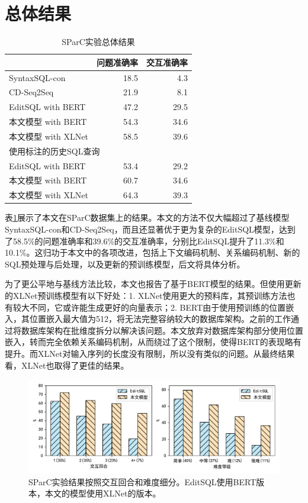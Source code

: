 \section{总体结果}

\begin{table}[]
    \centering
    \caption{SParC实验总体结果}
    \begin{tabular}{lrr}
    \hline
                        & 问题准确率 & 交互准确率 \\ \hline
    SyntaxSQL-con       & 18.5  & 4.3   \\
    CD-Seq2Seq          & 21.9  & 8.1   \\
    EditSQL with   BERT & 47.2  & 29.5  \\
    本文模型 with BERT      & 54.3  & 34.6  \\
    本文模型 with XLNet     & 58.5  & 39.6  \\ \hline
    \multicolumn{3}{l}{使用标注的历史SQL查询}    \\ \hline
    EditSQL with   BERT & 53.4  & 29.2  \\
    本文模型 with BERT      & 60.7  & 34.6  \\
    本文模型 with XLNet     & 64.3  & 39.3  \\ \hline
    \end{tabular}
    \label{overall-results}
\end{table}

表\ref{overall-results}展示了本文在SParC数据集上的结果。本文的方法不仅大幅超过了基线模型SyntaxSQL-con和CD-Seq2Seq，而且还显著优于更为复杂的EditSQL模型，达到了58.5\%的问题准确率和39.6\%的交互准确率，分别比EditSQL提升了11.3\%和10.1\%。这归功于本文中的各项改进，包括上下文编码机制、关系编码机制、新的SQL预处理与后处理，以及更新的预训练模型，后文将具体分析。

为了更公平地与基线方法比较，本文也报告了基于BERT模型的结果。但使用更新的XLNet预训练模型有以下好处：1. XLNet使用更大的预料库，其预训练方法也有较大不同，它或许能生成更好的向量表示；2. BERT由于使用预训练的位置嵌入，其位置嵌入最大值为512，将无法完整容纳较大的数据库架构。之前的工作通过将数据库架构在批维度拆分以解决该问题。本文放弃对数据库架构部分使用位置嵌入，转而完全依赖关系编码机制，从而绕过了这个限制，使得BERT的表现略有提升。而XLNet对输入序列的长度没有限制，所以没有类似的问题。从最终结果看，XLNet也取得了更佳的结果。

\begin{figure}[]
    \centering
    \includegraphics[width=\linewidth]{figure/overall.pdf}
    \caption{SParC实验结果按照交互回合和难度细分。EditSQL使用BERT版本，本文的模型使用XLNet的版本。}
    \label{result-subdivide}
\end{figure}

